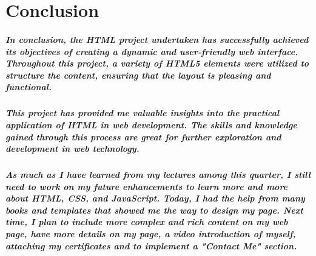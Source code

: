 \documentclass[12pt, letterpaper]{template}
\begin{document}
\chapter{Conclusion}
\paragraph{\Large In conclusion, the HTML project undertaken has successfully achieved its objectives of creating a dynamic and user-friendly web interface. Throughout this project, a variety of HTML5 elements were utilized to structure the content, ensuring that the layout is pleasing and functional.}

\paragraph{\Large This project has provided me valuable insights into the practical application of HTML in web development. The skills and knowledge gained through this process are great for further exploration and development in web technology.}

\paragraph{\Large As much as I have learned from my lectures among this quarter, I still need to work on my future enhancements to learn more and more about HTML, CSS, and JavaScript. Today, I had the help from many books and templates that showed me the way to design my page. Next time, I plan to include more complex and rich content on my web page, have more details on my page, a video introduction of myself, attaching my certificates and to implement a "Contact Me" section.}
\cite{BeginningHTMLCSS}\cite{HTML&CSS}\cite{JavaScript}
\appendix
\end{document}
